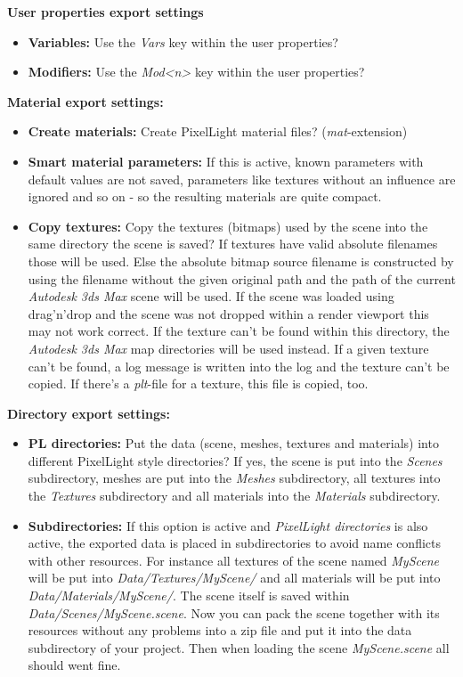 \textbf{User properties export settings}
\begin{itemize}
\item{\textbf{Variables:} Use the \emph{Vars} key within the user properties?}
\item{\textbf{Modifiers:} Use the \emph{Mod<n>} key within the user properties?}
\end{itemize}

\textbf{Material export settings:}
\begin{itemize}
\item{\textbf{Create materials:} Create PixelLight material files? (\emph{mat}-extension)}
\item{\textbf{Smart material parameters:} If this is active, known parameters with default values are not saved, parameters like textures without an influence are ignored and so on - so the resulting materials are quite compact.}
\item{\textbf{Copy textures:} Copy the textures (bitmaps) used by the scene into the same directory the scene is saved? If textures have valid absolute filenames those will be used. Else the absolute bitmap source filename is constructed by using the filename without the given original path and the path of the current \emph{Autodesk 3ds Max} scene will be used. If the scene was loaded using drag'n'drop and the scene was not dropped within a render viewport this may not work correct. If the texture can't be found within this directory, the \emph{Autodesk 3ds Max} map directories will be used instead. If a given texture can't be found, a log message is written into the log and the texture can't be copied. If there's a \emph{plt}-file for a texture, this file is copied, too.}
\end{itemize}

\textbf{Directory export settings:}
\begin{itemize}
\item{\textbf{PL directories:} Put the data (scene, meshes, textures and materials) into different PixelLight style directories? If yes, the scene is put into the \emph{Scenes} subdirectory, meshes are put into the \emph{Meshes} subdirectory, all textures into the \emph{Textures} subdirectory and all materials into the \emph{Materials} subdirectory.}
\item{\textbf{Subdirectories:} If this option is active and \emph{PixelLight directories} is also active, the exported data is placed in subdirectories to avoid name conflicts with other resources. For instance all textures of the scene named \emph{MyScene} will be put into \emph{Data/Textures/MyScene/} and all materials will be put into \emph{Data/Materials/MyScene/}. The scene itself is saved within \emph{Data/Scenes/MyScene.scene}. Now you can pack the scene together with its resources without any problems into a zip file and put it into the data subdirectory of your project. Then when loading the scene \emph{MyScene.scene} all should went fine.}
\end{itemize}

